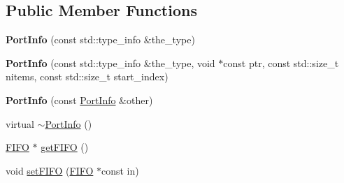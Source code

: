 \subsection*{Public Member Functions}
\begin{DoxyCompactItemize}
\item 
\hypertarget{struct_port_info_ada6f27ee68c0d489ad5a8ef41a990628}{}\label{struct_port_info_ada6f27ee68c0d489ad5a8ef41a990628} 
{\bfseries Port\+Info} (const std\+::type\+\_\+info \&the\+\_\+type)
\item 
\hypertarget{struct_port_info_a8a74d623dea1deab1d26920ece808dff}{}\label{struct_port_info_a8a74d623dea1deab1d26920ece808dff} 
{\bfseries Port\+Info} (const std\+::type\+\_\+info \&the\+\_\+type, void $\ast$const ptr, const std\+::size\+\_\+t nitems, const std\+::size\+\_\+t start\+\_\+index)
\item 
\hypertarget{struct_port_info_a8756457c158ca06d189b08b4b8fe3a12}{}\label{struct_port_info_a8756457c158ca06d189b08b4b8fe3a12} 
{\bfseries Port\+Info} (const \hyperlink{struct_port_info}{Port\+Info} \&other)
\item 
virtual \hyperlink{struct_port_info_a36e5aca1b7b20aace809490cebbc2d72}{$\sim$\+Port\+Info} ()
\item 
\hyperlink{class_f_i_f_o}{F\+I\+FO} $\ast$ \hyperlink{struct_port_info_a483d162fbe356e07381c6c5cfccb4f48}{get\+F\+I\+FO} ()
\item 
void \hyperlink{struct_port_info_a43a57cd624dcc44ccd9dcaba1d07a000}{set\+F\+I\+FO} (\hyperlink{class_f_i_f_o}{F\+I\+FO} $\ast$const in)
\end{DoxyCompactItemize}
